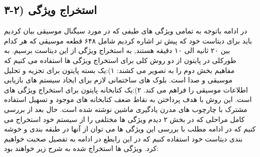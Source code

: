 \documentclass{article}
\begin{document}
\subsection{۳-۲) استخراج ویژگی}
در ادامه باتوجه به تمامی ویژگی های طیفی که در مورد سیگنال موسیقی بیان کردیم باید برای دیتاست خود که پیش تر اشاره کردیم شامل ۶۴۸ قطعه موسیقی که هر کدام بین ۲۰ ثانیه الی ۱۰ دقیقه هستند, به استخراج ویژگی از این دیتاست برسیم.\newline
به طورکلی در پایتون از دو روش کلی برای استخراج ویژگی ها استفاده می کنیم که مفاهیم بخش دوم را به تصویر می کشند:
۱):یک بسته پایتون برای تجزیه و تحلیل موسیقی و صدا است. بلوک های ساختمانی لازم برای ایجاد سیستم های بازیابی اطلاعات موسیقی را فراهم می کند.\newline
۲):یک کتابخانه پایتون برای استخراج ویژگی های است. این روش با هدف پرداختن به نقاط ضعف کتابخانه های موجود و تسهیل استفاده مشترک با چارچوب های مدرن یادگیری ماشین نوشته شده است.
\newline
حال بعد از بررسی کامل مراحلی که در بخش ۲ دیدم ویژگی ها مختلفی را از سیستم خود استخراج می کنیم که در ادامه مطلب با بررسی این ویژگی ها می توان از آنها در طبقه بندی و خوشه بندی دیتاست خود استفاده کنیم که در این رابطع در ادامه به تفصیل صحبت خواهیم کرد.\newline
ویژگی ها استخراج شده به شرح زیر خواهند بود:\newline
\end{document}
